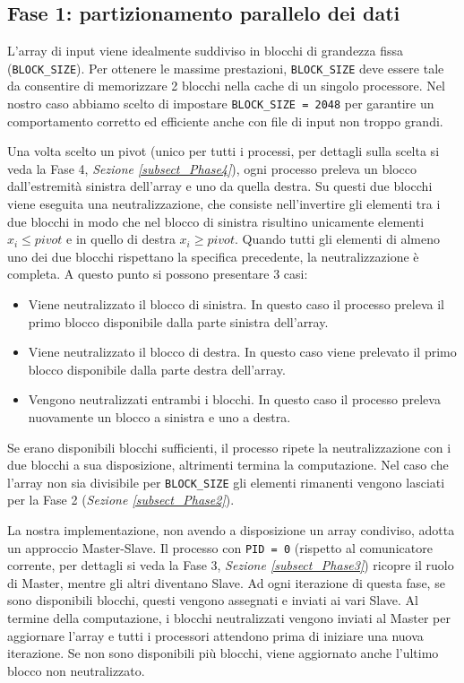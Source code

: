 \subsection{Fase 1: partizionamento parallelo dei dati} \label{subsect_Phase1}
L'array di input viene idealmente suddiviso in blocchi di grandezza fissa (\texttt{BLOCK\_SIZE}). Per ottenere le massime prestazioni, \texttt{BLOCK\_SIZE} deve essere tale da consentire di memorizzare 2 blocchi nella cache di un singolo processore. Nel nostro caso abbiamo scelto di impostare \texttt{BLOCK\_SIZE = 2048} per garantire un comportamento corretto ed efficiente anche con file di input non troppo grandi.

Una volta scelto un pivot (unico per tutti i processi, per dettagli sulla scelta si veda la Fase 4, \textit{Sezione \ref{subsect_Phase4}}), ogni processo preleva un blocco dall'estremità sinistra dell'array e uno da quella destra. Su questi due blocchi viene eseguita una neutralizzazione, che consiste nell'invertire gli elementi tra i due blocchi in modo che nel blocco di sinistra risultino unicamente elementi $x_i \le pivot$ e in quello di destra $x_i \ge pivot$.
Quando tutti gli elementi di almeno uno dei due blocchi rispettano la specifica precedente, la neutralizzazione è completa. A questo punto si possono presentare 3 casi:
\begin{itemize}
\item Viene neutralizzato il blocco di sinistra. In questo caso il processo preleva il primo blocco disponibile dalla parte sinistra dell'array.
\item Viene neutralizzato il blocco di destra. In questo caso viene prelevato il primo blocco disponibile dalla parte destra dell'array.
\item Vengono neutralizzati entrambi i blocchi. In questo caso il processo preleva nuovamente un blocco a sinistra e uno a destra.
\end{itemize}
Se erano disponibili blocchi sufficienti, il processo ripete la neutralizzazione con i due blocchi a sua disposizione, altrimenti termina la computazione.
Nel caso che l'array non sia divisibile per \texttt{BLOCK\_SIZE} gli elementi rimanenti vengono lasciati per la Fase 2 (\textit{Sezione \ref{subsect_Phase2}}).

La nostra implementazione, non avendo a disposizione un array condiviso, adotta un approccio Master-Slave. Il processo con \texttt{PID = 0} (rispetto al comunicatore corrente, per dettagli si veda la Fase 3, \textit{Sezione \ref{subsect_Phase3}}) ricopre il ruolo di Master, mentre gli altri diventano Slave.
Ad ogni iterazione di questa fase, se sono disponibili blocchi, questi vengono assegnati e inviati ai vari Slave. Al termine della computazione, i blocchi neutralizzati vengono inviati al Master per aggiornare l'array e tutti i processori attendono prima di iniziare una nuova iterazione.
Se non sono disponibili più blocchi, viene aggiornato anche l'ultimo blocco non neutralizzato.


